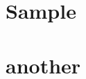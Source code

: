 \documentclass{book}
\begin{document}
\chapter{Sample}

\lipsum[1-4]

\chapter{another}
\lipsum[1-2]
\end{document}
